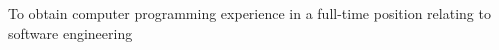 

To obtain computer programming experience in a full-time position relating to software engineering
